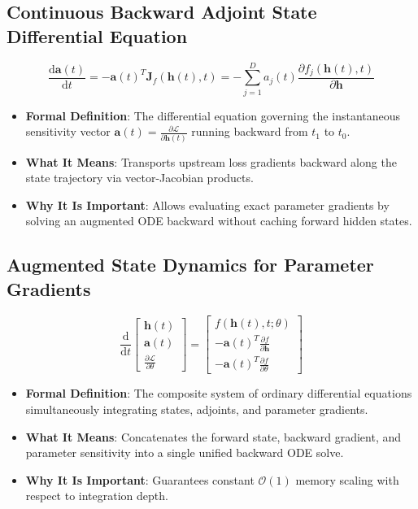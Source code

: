 \documentclass[11pt,a4paper]{article}
\theoremstyle{definition}
\begin{document}
\subsection{Continuous Backward Adjoint State Differential Equation}
{\boldmath
\begin{equation}
\frac{\mathrm{d}\mathbf{a}(t)}{\mathrm{d}t} = -\mathbf{a}(t)^T \mathbf{J}_f(\mathbf{h}(t), t) = -\sum_{j=1}^D a_j(t) \frac{\partial f_j(\mathbf{h}(t), t)}{\partial \mathbf{h}}
\end{equation}
}
\begin{itemize}
    \item \textbf{Formal Definition}: The differential equation governing the instantaneous sensitivity vector $\mathbf{a}(t) = \frac{\partial \mathcal{L}}{\partial \mathbf{h}(t)}$ running backward from $t_1$ to $t_0$.
    \item \textbf{What It Means}: Transports upstream loss gradients backward along the state trajectory via vector-Jacobian products.
    \item \textbf{Why It Is Important}: Allows evaluating exact parameter gradients by solving an augmented ODE backward without caching forward hidden states.
\end{itemize}

\subsection{Augmented State Dynamics for Parameter Gradients}
{\boldmath
\begin{equation}
\frac{\mathrm{d}}{\mathrm{d}t} \begin{bmatrix} \mathbf{h}(t) \\ \mathbf{a}(t) \\ \frac{\partial \mathcal{L}}{\partial \theta} \end{bmatrix} = \begin{bmatrix} f(\mathbf{h}(t), t; \theta) \\ -\mathbf{a}(t)^T \frac{\partial f}{\partial \mathbf{h}} \\ -\mathbf{a}(t)^T \frac{\partial f}{\partial \theta} \end{bmatrix}
\end{equation}
}
\begin{itemize}
    \item \textbf{Formal Definition}: The composite system of ordinary differential equations simultaneously integrating states, adjoints, and parameter gradients.
    \item \textbf{What It Means}: Concatenates the forward state, backward gradient, and parameter sensitivity into a single unified backward ODE solve.
    \item \textbf{Why It Is Important}: Guarantees constant $\mathcal{O}(1)$ memory scaling with respect to integration depth.
\end{itemize}
\end{document}

